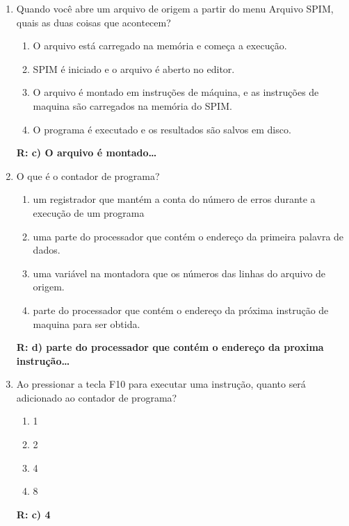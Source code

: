 \documentclass[a4paper,11pt]{article}
\begin{document}
\begin{enumerate}
    \item{Quando você abre um arquivo de origem a partir do menu Arquivo SPIM, quais as duas coisas que 
            acontecem? }
        \begin{enumerate}
            \item{O arquivo está carregado na memória e começa a execução.}
            \item{SPIM é iniciado e o arquivo é aberto no editor.}
            \item{O arquivo é montado em instruções de máquina, e as instruções de maquina são
                    carregados na memória do SPIM.}
            \item{O programa é executado e os resultados são salvos em disco.}
        \end{enumerate}
        \textbf{R: c) O arquivo é montado\dots }

    \item{O que é o contador de programa?}
        \begin{enumerate}
            \item{um registrador que mantém a conta do número de erros durante a execução de um
                    programa}
            \item{uma parte do processador que contém o endereço da primeira palavra de dados.}
            \item{uma variável na montadora que os números das linhas do arquivo de origem.}
            \item{parte do processador que contém o endereço da próxima instrução de maquina para ser
                    obtida.}
        \end{enumerate}
        \textbf{R: d) parte do processador que contém o endereço da proxima instrução\dots}

    \item{Ao pressionar a tecla F10 para executar uma instrução, quanto será adicionado ao contador de
            programa?}
        \begin{enumerate}
            \item{1}
            \item{2}
            \item{4}
            \item{8}
        \end{enumerate}
        \textbf{R: c) 4}


\end{enumerate}
\end{document}
